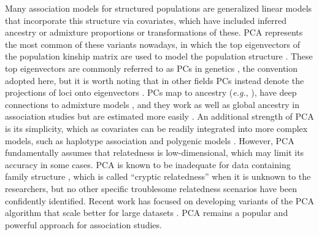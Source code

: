 \documentclass[11pt]{article}
\begin{document}
Many association models for structured populations are generalized linear models that incorporate this structure via covariates, which have included inferred ancestry or admixture proportions \citep{pritchard_association_2000} or transformations of these.
PCA represents the most common of these variants nowadays, in which the top eigenvectors of the population kinship matrix are used to model the population structure \citep{zhang_semiparametric_2003, price_principal_2006, bouaziz_accounting_2011}.
These top eigenvectors are commonly referred to as PCs in genetics \citep{patterson_population_2006}, the convention adopted here, but it is worth noting that in other fields PCs instead denote the projections of loci onto eigenvectors \citep{jolliffe_principal_2002}.
PCs map to ancestry (\textit{e.g.}, \cite{alexander_fast_2009, zhou_strong_2016}), have deep connections to admixture models \citep{mcvean_genealogical_2009,zheng_eigenanalysis_2016,cabreros_likelihood-free_2019}, and they work as well as global ancestry in association studies but are estimated more easily \citep{patterson_population_2006, zhao_arabidopsis_2007, alexander_fast_2009, bouaziz_accounting_2011}.
An additional strength of PCA is its simplicity, which as covariates can be readily integrated into more complex models, such as haplotype association \citep{xu_detecting_2014} and polygenic models \citep{qian_fast_2020}.
However, PCA fundamentally assumes that relatedness is low-dimensional, which may limit its accuracy in some cases.
PCA is known to be inadequate for data containing family structure \citep{patterson_population_2006, thornton_roadtrips:_2010, price_new_2010}, which is called ``cryptic relatedness'' when it is unknown to the researchers, but no other specific troublesome relatedness scenarios have been confidently identified.
Recent work has focused on developing variants of the PCA algorithm that scale better for large datasets \citep{lee_sparse_2012, abraham_fast_2014, galinsky_fast_2016, abraham_flashpca2:_2017, agrawal_scalable_2020}.
PCA remains a popular and powerful approach for association studies.
\end{document}
